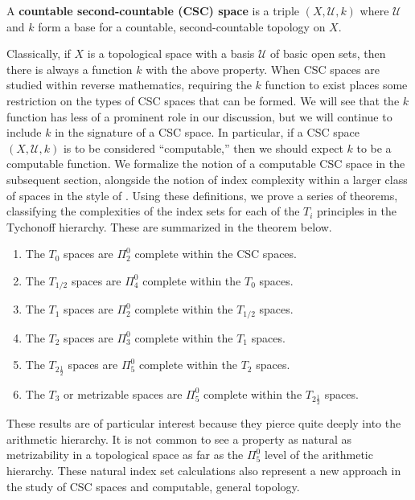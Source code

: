\documentclass[11pt]{amsart}
\theoremstyle{remark}
\begin{document}
\begin{definition}
    A \textbf{countable second-countable (CSC) space} is a triple $(X, \mathcal{U}, k)$ where $\mathcal{U}$ and $k$ form a base for a countable, second-countable topology on $X$.
\end{definition}

Classically, if $X$ is a topological space with a basis $\mathcal{U}$ of basic open sets, then there is always a function $k$ with the above property. When CSC spaces are studied within reverse mathematics, requiring the $k$ function to exist places some restriction on the types of CSC spaces that can be formed. We will see that the $k$ function has less of a prominent role in our discussion, but we will continue to include $k$ in the signature of a CSC space. In particular, if a CSC space $(X, \mathcal{U}, k)$ is to be considered ``computable,'' then we should expect $k$ to be a computable function.
We formalize the notion of a computable CSC space in the subsequent section, alongside the notion of index complexity within a larger class of spaces in the style of \cite{WC05}.
Using these definitions, we prove a series of theorems, classifying the complexities of the index sets for each of the $T_i$ principles in the Tychonoff hierarchy.
These are summarized in the theorem below.
\begin{theorem}
    \begin{enumerate}
        \item The $T_0$ spaces are $\Pi_2^0$ complete within the CSC spaces.
        \item The $T_{1/2}$ spaces are $\Pi_4^0$ complete within the $T_0$ spaces.
        \item The $T_1$ spaces are $\Pi_2^0$ complete within the $T_{1/2}$ spaces.
        \item The $T_2$ spaces are $\Pi_3^0$ complete within the $T_1$ spaces.
        \item The $T_{2\frac12}$ spaces are $\Pi_5^0$ complete within the $T_2$ spaces.
        \item The $T_3$ or metrizable spaces are $\Pi_5^0$ complete within the $T_{2\frac12}$ spaces.
    \end{enumerate}
\end{theorem}
\noindent These results are of particular interest because they pierce quite deeply into the arithmetic hierarchy.
It is not common to see a property as natural as metrizability in a topological space as far as the $\Pi_5^0$ level of the arithmetic hierarchy.
These natural index set calculations also represent a new approach in the study of CSC spaces and computable, general topology.
\end{document}
